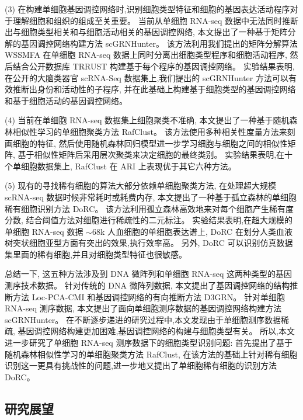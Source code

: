 (3) 在构建单细胞基因调控网络时,识别细胞类型特征和细胞的基因表达活动程序对于理解细胞和组织的组成至关重要。
当前从单细胞 RNA-seq 数据中无法同时推断出与细胞类型相关和与细胞活动相关的基因调控网络,
本文提出了一种基于矩阵分解的基因调控网络构建方法 scGRNHunter。
该方法利用我们提出的矩阵分解算法 WSSMFA 在单细胞 RNA-seq 数据上同时分离出细胞类型程序和细胞活动程序,
然后结合公开数据库 TRRUST 构建基于每个程序的基因调控网络。
实验结果表明,在公开的大脑类器官 scRNA-Seq 数据集上,我们提出的 scGRNHunter 方法可以有效推断出身份和活动性的子程序, 
并在此基础上构建基于细胞类型的基因调控网络和基于细胞活动的基因调控网络。


(4) 当前在单细胞 RNA-seq 数据集上细胞聚类不准确,
本文提出了一种基于随机森林相似性学习的单细胞聚类方法 RafClust。
该方法使用多种相关性度量方法来刻画细胞的特征, 
然后使用随机森林回归模型进一步学习细胞与细胞之间的相似性矩阵,
基于相似性矩阵后采用层次聚类来决定细胞的最终类别。
实验结果表明,在十个单细胞数据集上, RafClust 在 ARI 上表现优于其它六种方法。

(5) 现有的寻找稀有细胞的算法大部分依赖单细胞聚类方法,
在处理超大规模 scRNA-seq 数据时候非常耗时或耗费内存,
本文提出了一种基于孤立森林的单细胞稀有细胞识别方法 DoRC。
该方法利用孤立森林高效地来对每个细胞产生稀有度分数,
结合阈值方法对细胞进行稀疏性的二元标注。
实验结果表明,在超大规模的单细胞 RNA-seq 数据 ${\sim}68$k 人血细胞的单细胞表达谱上,
 DoRC 在划分人类血液树突状细胞亚型方面有突出的效果,执行效率高。
另外, DoRC 可以识别仿真数据集里面的稀有细胞,并且对细胞类型特征也很敏感。


总结一下, 这五种方法涉及到 DNA 微阵列和单细胞 RNA-seq 这两种类型的基因测序技术数据。
针对传统的 DNA 微阵列数据, 本文提出了基因调控网络的结构推断方法 Loc-PCA-CMI 和基因调控网络的有向推断方法 D3GRN。
针对单细胞 RNA-seq 测序数据, 本文提出了面向单细胞测序数据的基因调控网络构建方法 scGRNHunter。
在不断逐步递进的研究过程中,本文发现由于单细胞测序数据稀疏, 基因调控网络构建更加困难,基因调控网络的构建与细胞类型有关。
所以,本文进一步研究了单细胞 RNA-seq 测序数据下的细胞类型识别问题: 首先提出了基于随机森林相似性学习的单细胞聚类方法 RafClust, 
在该方法的基础上针对稀有细胞识别这一更具有挑战性的问题,进一步地又提出了单细胞稀有细胞的识别方法 DoRC。

\subsection{研究展望}

